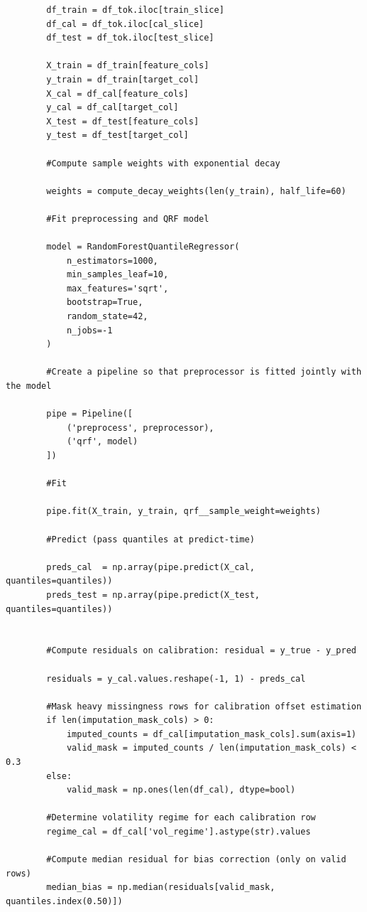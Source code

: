\documentclass[
  a4paper,
  DIV=11,
  numbers=noendperiod]{scrreprt}
\begin{document}
\begin{verbatim}
        df_train = df_tok.iloc[train_slice]
        df_cal = df_tok.iloc[cal_slice]
        df_test = df_tok.iloc[test_slice]

        X_train = df_train[feature_cols]
        y_train = df_train[target_col]
        X_cal = df_cal[feature_cols]
        y_cal = df_cal[target_col]
        X_test = df_test[feature_cols]
        y_test = df_test[target_col]

        #Compute sample weights with exponential decay

        weights = compute_decay_weights(len(y_train), half_life=60)

        #Fit preprocessing and QRF model

        model = RandomForestQuantileRegressor(
            n_estimators=1000,
            min_samples_leaf=10,
            max_features='sqrt',
            bootstrap=True,
            random_state=42,
            n_jobs=-1
        )

        #Create a pipeline so that preprocessor is fitted jointly with the model

        pipe = Pipeline([
            ('preprocess', preprocessor),
            ('qrf', model)
        ])

        #Fit

        pipe.fit(X_train, y_train, qrf__sample_weight=weights)

        #Predict (pass quantiles at predict-time)

        preds_cal  = np.array(pipe.predict(X_cal,  quantiles=quantiles))
        preds_test = np.array(pipe.predict(X_test, quantiles=quantiles))


        #Compute residuals on calibration: residual = y_true - y_pred

        residuals = y_cal.values.reshape(-1, 1) - preds_cal

        #Mask heavy missingness rows for calibration offset estimation
        if len(imputation_mask_cols) > 0:
            imputed_counts = df_cal[imputation_mask_cols].sum(axis=1)
            valid_mask = imputed_counts / len(imputation_mask_cols) < 0.3
        else:
            valid_mask = np.ones(len(df_cal), dtype=bool)

        #Determine volatility regime for each calibration row
        regime_cal = df_cal['vol_regime'].astype(str).values

        #Compute median residual for bias correction (only on valid rows)
        median_bias = np.median(residuals[valid_mask, quantiles.index(0.50)])


\end{verbatim}
\end{document}
